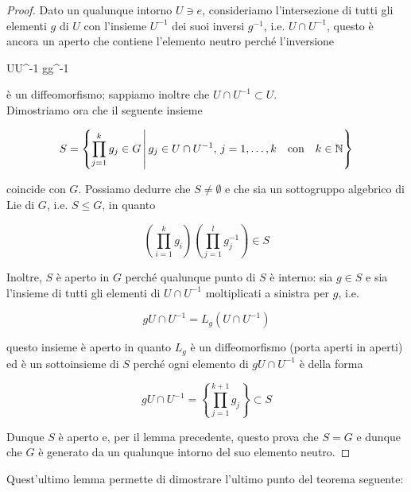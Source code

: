 \begin{proof}
	Dato un qualunque intorno $ U \ni e $, consideriamo l'intersezione di tutti gli elementi $ g $ di $ U $ con l'insieme $ U^{-1} $ dei suoi inversi $ g^{-1} $, i.e. $ U \cap U^{-1} $,  questo è ancora un aperto che contiene l'elemento neutro perché l'inversione
	
		{U}{U^{-1}}
		{g}{g^{-1}}
	
	è un diffeomorfismo; sappiamo inoltre che $ U \cap U^{-1} \subset U $.\\
	Dimostriamo ora che il seguente insieme
	
	\begin{equation}
		S = \left\{ \prod_{j=1}^{k} g_{j} \in G \st g_{j} \in U \cap U^{-1}, \, j=1,\dots,k \qq{con} k \in \N \right\}
	\end{equation}
	
	coincide con $ G $. Possiamo dedurre che $ S \neq \emptyset $ e che sia un sottogruppo algebrico di Lie di $ G $, i.e. $ S \leqslant G $, in quanto
	
	\begin{equation}
		\left( \prod_{i=1}^{k} g_{i} \right) \left( \prod_{j=1}^{l} g_{j}^{-1} \right) \in S
	\end{equation}
	
	Inoltre, $ S $ è aperto in $ G $ perché qualunque punto di $ S $ è interno: sia $ g \in S $ e sia l'insieme di tutti gli elementi di $ U \cap U^{-1} $ moltiplicati a sinistra per $ g $, i.e.
	
	\begin{equation}
		g U \cap U^{-1} = L_{g}(U \cap U^{-1})
	\end{equation}
	
	questo insieme è aperto in quanto $ L_{g} $ è un diffeomorfismo (porta aperti in aperti) ed è un sottoinsieme di $ S $ perché ogni elemento di $ g U \cap U^{-1} $ è della forma
	
	\begin{equation}
		g U \cap U^{-1} = \left\{ \prod_{j=1}^{k+1} g_{j} \right\} \subset S
	\end{equation}
	
	Dunque $ S $ è aperto e, per il lemma precedente, questo prova che $ S = G $ e dunque che $ G $ è generato da un qualunque intorno del suo elemento neutro.
\end{proof}

Quest'ultimo lemma permette di dimostrare l'ultimo punto del teorema seguente:


